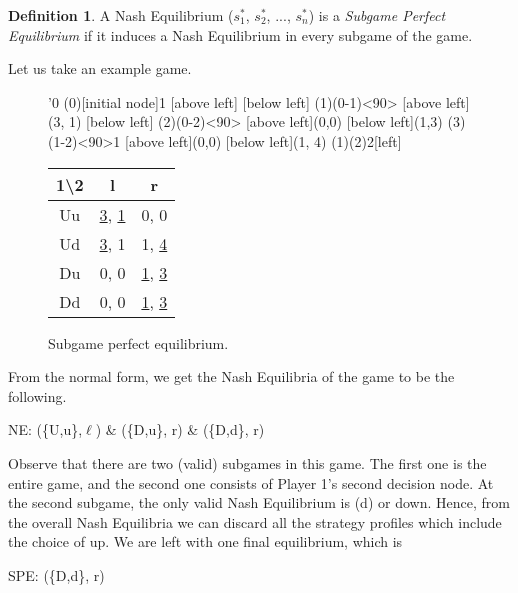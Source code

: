 \documentclass[11pt]{article}
\theoremstyle{definition}
\newtheorem*{definition}{Definition}
\begin{document}
\begin{definition}
A Nash Equilibrium ($s_1^*$, $s_2^*$, $...$, $s_n^*$) is a \textit{Subgame Perfect Equilibrium} if it induces a Nash Equilibrium in every subgame of the game.
\end{definition}

Let us take an example game.

\begin{figure}[h!]
\centering
\begin{minipage}{.5\textwidth}
	\centering
	\begin{istgame}
	\setistgrowdirection'{0}
	\xtdistance{15mm}{20mm}
	\istroot(0)[initial node]{1}
		[above left]
		[below left]
		\endist
	\xtdistance{20mm}{10mm}
	\istroot(1)(0-1)<90>
		\istb{\ell}[above left]{(3, 1)}
		[below left]
		\endist
	\istroot(2)(0-2)<90>
		\istb{\ell}[above left]{(0,0)}
		[below left]{(1,3)}
		\endist
	\istroot(3)(1-2)<90>{1}
		[above left]{(0,0)}
		[below left]{(1, 4)}
		\endist
	\xtInfoset(1)(2){2}[left]
	\end{istgame}
\end{minipage}%
\begin{minipage}{.5\textwidth}
	\centering
	\begin{tabular}{|c|c|c|}
		\hline
		1\textbackslash 2 & l & r \\
		\hline
		Uu & \underline{3}, \underline{1} & 0, 0 \\
		\hline
		Ud & \underline{3}, 1 & 1, \underline{4} \\
		\hline
		Du & 0, 0 & \underline{1}, \underline{3} \\
		\hline
		Dd & 0, 0 & \underline{1}, \underline{3} \\
		\hline
	\end{tabular}
\end{minipage}
\label{fig:expsub}
\caption{Subgame perfect equilibrium.}
\end{figure}

From the normal form, we get the Nash Equilibria of the game to be the following.
\begin{center}
NE: (\{U,u\},$\ell$) \& (\{D,u\}, r) \& (\{D,d\}, r)
\end{center}

Observe that there are two (valid) subgames in this game. The first one is the entire game, and the second one consists of Player 1's second decision node. 
At the second subgame, the only valid Nash Equilibrium is (d) or down. Hence, from the overall Nash Equilibria we can discard all the strategy profiles which include the choice of up. We are left with one final equilibrium, which is 
\begin{center}
SPE: (\{D,d\}, r)
\end{center}
\end{document}
